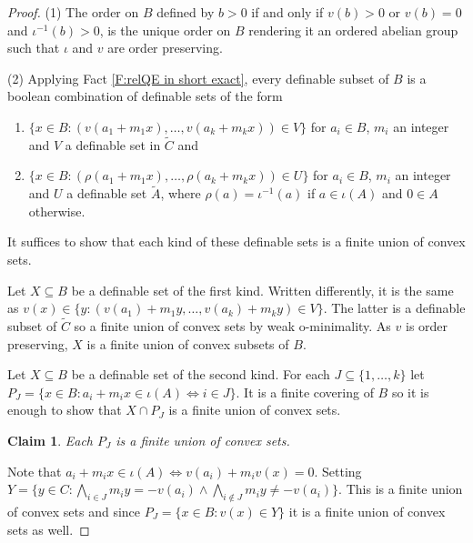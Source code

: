 \documentclass[11pt]{amsart}
\newtheorem{claim}{Claim}[theorem]
\theoremstyle{definition}
\newcommand{\bk}{\textbf{k}}
\newcommand{\0}{\emptyset}
\newenvironment{claimproof}[1][\proofname]
{%
	\proof[#1]%
	\renewcommand*\qedsymbol{$\square$ (claim)}%
}
{%
	\endproof%
}
\begin{document}
    \begin{proof}
        (1) The order on $B$ defined by $b>0$ if and only if $v(b)>0$ or $v(b)=0$ and $\iota^{-1}(b)>0$, is the unique order on $B$ rendering it an ordered abelian group such that $\iota$ and $v$ are order preserving. 
        
        (2) Applying Fact \ref{F:relQE in short exact}, every definable subset of $B$ is a boolean combination of definable sets of the form 
        \begin{enumerate}
            \item $\{x\in B: (v(a_1+m_1x),\dots, v(a_k+m_kx))\in V\}$ for $a_i\in B$, $m_i$ an integer and $V$ a definable set in $\widetilde{C}$ and
            \item $\{x\in B:(\rho(a_1+m_1x),\dots,\rho(a_k+m_kx))\in U\}$ for $a_i\in B$, $m_i$ an integer and $U$ a definable set $\widetilde{A}$, where $\rho(a)=\iota^{-1}(a)$ if $a\in \iota(A)$ and $0\in A$ otherwise. 
        \end{enumerate}
        
        It suffices to show that each kind of these definable sets is a finite union of convex sets.
        
        Let $X\subseteq B$ be a definable set of the first kind. Written differently, it is the same as $v(x)\in \{y: (v(a_1)+m_1y,\dots, v(a_k)+m_ky)\in V\}$. The latter is a definable subset of $\widetilde{C}$ so a finite union of convex sets by weak o-minimality. As $v$ is order preserving, $X$ is a finite union of convex subsets of $B$.

        Let $X\subseteq B$ be a definable set of the second kind. For each $J\subseteq \{1,\dots,k\}$ let $P_J=\{x\in B: a_i+m_ix\in \iota(A)\iff i\in J\}$. It is a finite covering of $B$ so it is enough to show that $X\cap P_J$ is a finite union of convex sets.

        \begin{claim}
            Each $P_J$ is a finite union of  convex sets.
        \end{claim}
        \begin{claimproof}
            Note that $a_i+m_ix\in \iota(A)\iff v(a_i)+m_iv(x)=0$. Setting $Y=\{y\in C:\bigwedge_{i\in J} m_iy=-v(a_i)\wedge \bigwedge_{i\notin J}m_iy\neq-v(a_i)\}$. This is a finite union of convex sets and since $P_J=\{x\in B:v(x)\in Y\}$ it is a finite union of convex sets as well.      
        \end{claimproof}
        
        

\end{proof}
\end{document}

